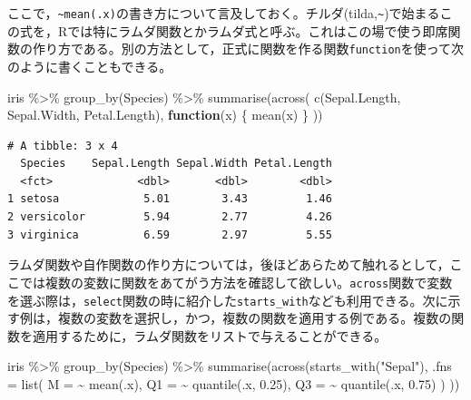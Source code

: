 \documentclass[
  a4paper,
]{ltjsbook}
\newenvironment{Shaded}{\begin{snugshade}}{\end{snugshade}}
\newcommand{\AttributeTok}[1]{\textcolor[rgb]{0.40,0.45,0.13}{#1}}
\newcommand{\ControlFlowTok}[1]{\textcolor[rgb]{0.00,0.23,0.31}{\textbf{#1}}}
\newcommand{\FloatTok}[1]{\textcolor[rgb]{0.68,0.00,0.00}{#1}}
\newcommand{\FunctionTok}[1]{\textcolor[rgb]{0.28,0.35,0.67}{#1}}
\newcommand{\NormalTok}[1]{\textcolor[rgb]{0.00,0.23,0.31}{#1}}
\newcommand{\SpecialCharTok}[1]{\textcolor[rgb]{0.37,0.37,0.37}{#1}}
\newcommand{\StringTok}[1]{\textcolor[rgb]{0.13,0.47,0.30}{#1}}
\begin{document}
ここで，\texttt{\textasciitilde{}mean(.x)}の書き方について言及しておく。チルダ(tilda,\texttt{\textasciitilde{}})で始まるこの式を，Rでは特にラムダ関数とかラムダ式と呼ぶ。これはこの場で使う即席関数の作り方である。別の方法として，正式に関数を作る関数\texttt{function}を使って次のように書くこともできる。

\begin{Shaded}
\begin{Highlighting}[]
\NormalTok{iris }\SpecialCharTok{\%\textgreater{}\%}
  \FunctionTok{group\_by}\NormalTok{(Species) }\SpecialCharTok{\%\textgreater{}\%}
  \FunctionTok{summarise}\NormalTok{(}\FunctionTok{across}\NormalTok{(}
    \FunctionTok{c}\NormalTok{(Sepal.Length, Sepal.Width, Petal.Length),}
    \ControlFlowTok{function}\NormalTok{(x) \{}
      \FunctionTok{mean}\NormalTok{(x)}
\NormalTok{    \}}
\NormalTok{  ))}
\end{Highlighting}
\end{Shaded}

\begin{verbatim}
# A tibble: 3 x 4
  Species    Sepal.Length Sepal.Width Petal.Length
  <fct>             <dbl>       <dbl>        <dbl>
1 setosa             5.01        3.43         1.46
2 versicolor         5.94        2.77         4.26
3 virginica          6.59        2.97         5.55
\end{verbatim}

ラムダ関数や自作関数の作り方については，後ほどあらためて触れるとして，ここでは複数の変数に関数をあてがう方法を確認して欲しい。\texttt{across}関数で変数を選ぶ際は，\texttt{select}関数の時に紹介した\texttt{starts\_with}なども利用できる。次に示す例は，複数の変数を選択し，かつ，複数の関数を適用する例である。複数の関数を適用するために，ラムダ関数をリストで与えることができる。

\begin{Shaded}
\begin{Highlighting}[]
\NormalTok{iris }\SpecialCharTok{\%\textgreater{}\%}
  \FunctionTok{group\_by}\NormalTok{(Species) }\SpecialCharTok{\%\textgreater{}\%}
  \FunctionTok{summarise}\NormalTok{(}\FunctionTok{across}\NormalTok{(}\FunctionTok{starts\_with}\NormalTok{(}\StringTok{"Sepal"}\NormalTok{),}
    \AttributeTok{.fns =} \FunctionTok{list}\NormalTok{(}
      \AttributeTok{M =} \SpecialCharTok{\textasciitilde{}} \FunctionTok{mean}\NormalTok{(.x),}
      \AttributeTok{Q1 =} \SpecialCharTok{\textasciitilde{}} \FunctionTok{quantile}\NormalTok{(.x, }\FloatTok{0.25}\NormalTok{),}
      \AttributeTok{Q3 =} \SpecialCharTok{\textasciitilde{}} \FunctionTok{quantile}\NormalTok{(.x, }\FloatTok{0.75}\NormalTok{)}
\NormalTok{    )}
\NormalTok{  ))}
\end{Highlighting}
\end{Shaded}
\end{document}
